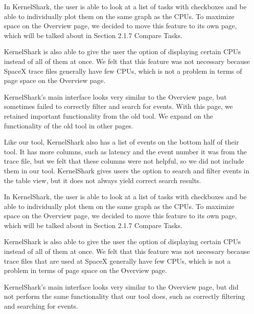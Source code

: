 \documentclass{hmcclinic}
\begin{document}
  In KernelShark, the user is able to look at a list of tasks with checkboxes
  and be able to individually plot them on the same graph as the CPUs. To
  maximize space on the Overview page, we decided to move this feature to its
  own page, which will be talked about in Section 2.1.7 Compare Tasks. 

  KernelShark is also able to give the user the option of displaying certain
  CPUs instead of all of them at once. We felt that this feature was not
  necessary because SpaceX trace files generally have few CPUs, which is not a
  problem in terms of page space on the Overview page.

  KernelShark's main interface looks very similar to the Overview page, but
  sometimes failed to correctly filter and search for events. With this page,
  we retained important functionality from the old tool. We expand on the
  functionality of the old tool in other pages.

     Like our tool, KernelShark also has a list of events on the bottom half of their tool. 
     It has more columns, such as latency and the event number it was from the trace file, 
     but we felt that these columns were not helpful, so we did not include them
     in our tool. KernelShark gives users the option to search and filter events in the table view, but it does not always yield correct search results. 
    
    In KernelShark, the user is able to look at a list of tasks with checkboxes and be able to individually plot them on the same graph as the CPUs. To maximize space on the Overview page, we decided to move this feature to its own page, which will be talked about in Section 2.1.7 Compare Tasks. 
    
    KernelShark is also able to give the user the option of displaying certain
    CPUs instead of all of them at once. We felt that this feature was not
    necessary because trace files that are used at SpaceX generally have few CPUs, which is not a problem in terms of page space on the Overview page.
    
    KernelShark's main interface looks very similar to the Overview page, but did not perform the same functionality that our tool does, such as correctly filtering and searching for events.

    
\end{document}

